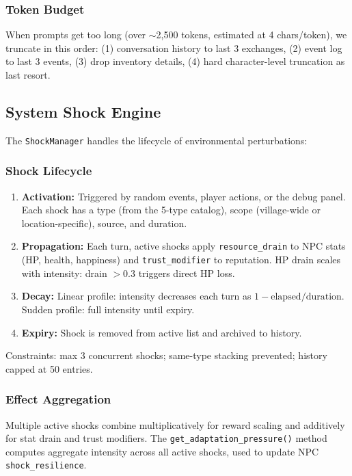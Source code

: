 \subsubsection{Token Budget}

When prompts get too long (over ${\sim}$2,500 tokens, estimated at 4 chars/token), we truncate in this order: (1) conversation history to last 3 exchanges, (2) event log to last 3 events, (3) drop inventory details, (4) hard character-level truncation as last resort.

\subsection{System Shock Engine}

The \texttt{ShockManager} handles the lifecycle of environmental perturbations:

\subsubsection{Shock Lifecycle}

\begin{enumerate}
    \item \textbf{Activation:} Triggered by random events, player actions, or the debug panel. Each shock has a type (from the 5-type catalog), scope (village-wide or location-specific), source, and duration.
    \item \textbf{Propagation:} Each turn, active shocks apply \texttt{resource\_drain} to NPC stats (HP, health, happiness) and \texttt{trust\_modifier} to reputation. HP drain scales with intensity: drain $> 0.3$ triggers direct HP loss.
    \item \textbf{Decay:} Linear profile: intensity decreases each turn as $1 - \text{elapsed}/\text{duration}$. Sudden profile: full intensity until expiry.
    \item \textbf{Expiry:} Shock is removed from active list and archived to history.
\end{enumerate}

Constraints: max 3 concurrent shocks; same-type stacking prevented; history capped at 50 entries.

\subsubsection{Effect Aggregation}

Multiple active shocks combine multiplicatively for reward scaling and additively for stat drain and trust modifiers. The \texttt{get\_adaptation\_pressure()} method computes aggregate intensity across all active shocks, used to update NPC \texttt{shock\_resilience}.

